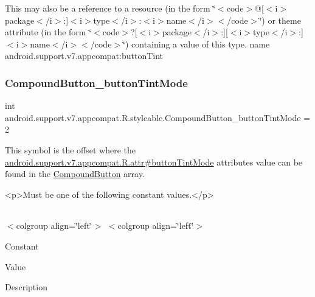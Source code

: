 This may also be a reference to a resource (in the form \char`\"{}$<$code$>$@\mbox{[}$<$i$>$package$<$/i$>$\+:\mbox{]}$<$i$>$type$<$/i$>$\+:$<$i$>$name$<$/i$>$$<$/code$>$\char`\"{}) or theme attribute (in the form \char`\"{}$<$code$>$?\mbox{[}$<$i$>$package$<$/i$>$\+:\mbox{]}\mbox{[}$<$i$>$type$<$/i$>$\+:\mbox{]}$<$i$>$name$<$/i$>$$<$/code$>$\char`\"{}) containing a value of this type.  name android.\+support.\+v7.\+appcompat\+:button\+Tint \mbox{\label{classandroid_1_1support_1_1v7_1_1appcompat_1_1R_1_1styleable_a0365578c9542a2110fb6a88b59d2d604}} 
\subsubsection{\texorpdfstring{Compound\+Button\+\_\+button\+Tint\+Mode}{CompoundButton\_buttonTintMode}}
{\footnotesize\ttfamily int android.\+support.\+v7.\+appcompat.\+R.\+styleable.\+Compound\+Button\+\_\+button\+Tint\+Mode = 2\hspace{0.3cm}{\ttfamily [static]}}

This symbol is the offset where the \hyperlink{classandroid_1_1support_1_1v7_1_1appcompat_1_1R_1_1attr_af9ff20ba654b1ae027744dc8217560e1}{android.\+support.\+v7.\+appcompat.\+R.\+attr\#button\+Tint\+Mode} attribute\textquotesingle{}s value can be found in the \hyperlink{classandroid_1_1support_1_1v7_1_1appcompat_1_1R_1_1styleable_aa66e991e0d5dc9db5a9048c91817235f}{Compound\+Button} array.

\begin{DoxyVerb}      <p>Must be one of the following constant values.</p>
\end{DoxyVerb}
 \tabulinesep=1mm
\begin{longtabu} spread 0pt [c]{*{0}{|X[-1]}|}
\hline
\end{longtabu}
$<$colgroup align=\char`\"{}left\char`\"{}$>$ $<$colgroup align=\char`\"{}left\char`\"{}$>$ 

Constant

Value

Description 

